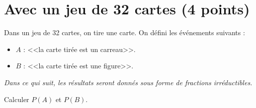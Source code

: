 \section{Avec un jeu de 32 cartes (4 points)}

Dans un jeu de 32 cartes, on tire une carte. On défini les événements suivants :

\begin{itemize}
	\item $A$ : <<la carte tirée est un carreau>>.
	\item $B$ : <<la carte tirée est une figure>>.
\end{itemize}

\textit{Dans ce qui suit, les résultats seront donnés sous forme de fractions irréductibles.}

\begin{questions}
	\question[1] Calculer $P(A)$ et $P(B)$.
	
	
	\question 
	
\end{questions}